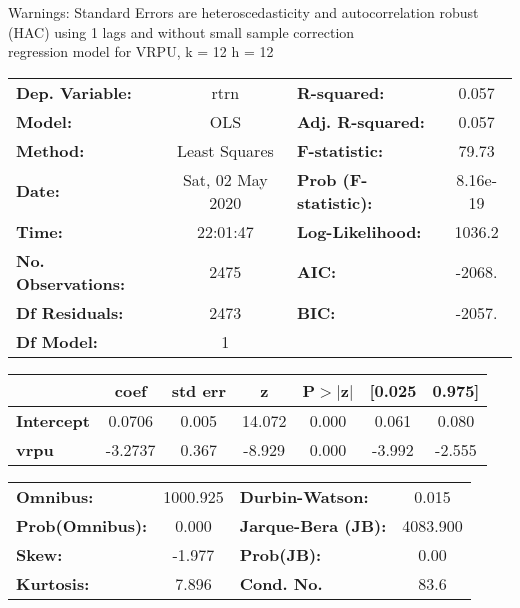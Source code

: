 Warnings: \newline
 [1] Standard Errors are heteroscedasticity and autocorrelation robust (HAC) using 1 lags and without small sample correction\\ 

regression model for VRPU, k = 12 h = 12\begin{center}
\begin{tabular}{lclc}
\toprule
\textbf{Dep. Variable:}    &       rtrn       & \textbf{  R-squared:         } &     0.057   \\
\textbf{Model:}            &       OLS        & \textbf{  Adj. R-squared:    } &     0.057   \\
\textbf{Method:}           &  Least Squares   & \textbf{  F-statistic:       } &     79.73   \\
\textbf{Date:}             & Sat, 02 May 2020 & \textbf{  Prob (F-statistic):} &  8.16e-19   \\
\textbf{Time:}             &     22:01:47     & \textbf{  Log-Likelihood:    } &    1036.2   \\
\textbf{No. Observations:} &        2475      & \textbf{  AIC:               } &    -2068.   \\
\textbf{Df Residuals:}     &        2473      & \textbf{  BIC:               } &    -2057.   \\
\textbf{Df Model:}         &           1      & \textbf{                     } &             \\
\bottomrule
\end{tabular}
\begin{tabular}{lcccccc}
                   & \textbf{coef} & \textbf{std err} & \textbf{z} & \textbf{P$> |$z$|$} & \textbf{[0.025} & \textbf{0.975]}  \\
\midrule
\textbf{Intercept} &       0.0706  &        0.005     &    14.072  &         0.000        &        0.061    &        0.080     \\
\textbf{vrpu}      &      -3.2737  &        0.367     &    -8.929  &         0.000        &       -3.992    &       -2.555     \\
\bottomrule
\end{tabular}
\begin{tabular}{lclc}
\textbf{Omnibus:}       & 1000.925 & \textbf{  Durbin-Watson:     } &    0.015  \\
\textbf{Prob(Omnibus):} &   0.000  & \textbf{  Jarque-Bera (JB):  } & 4083.900  \\
\textbf{Skew:}          &  -1.977  & \textbf{  Prob(JB):          } &     0.00  \\
\textbf{Kurtosis:}      &   7.896  & \textbf{  Cond. No.          } &     83.6  \\
\bottomrule
\end{tabular}
\end{center}

